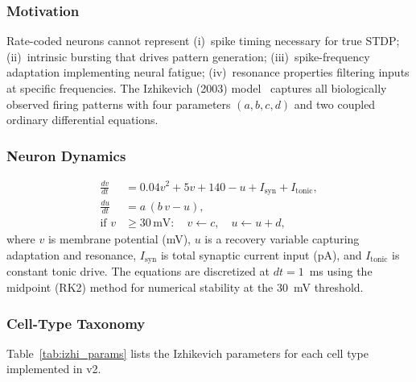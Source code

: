 \documentclass[11pt,a4paper]{article}
\begin{document}
\subsubsection{Motivation}

Rate-coded neurons cannot represent (i)~spike timing necessary for
true STDP; (ii)~intrinsic bursting that drives pattern generation;
(iii)~spike-frequency adaptation implementing neural fatigue;
(iv)~resonance properties filtering inputs at specific frequencies.
The Izhikevich (2003) model~\cite{izhikevich2003} captures all
biologically observed firing patterns with four parameters $(a, b, c, d)$
and two coupled ordinary differential equations.

\subsubsection{Neuron Dynamics}

\begin{equation}\label{eq:izhi}
\boxed{
\begin{aligned}
  \frac{dv}{dt} &= 0.04v^2 + 5v + 140 - u + I_\mathrm{syn} + I_\mathrm{tonic}, \\
  \frac{du}{dt} &= a\,(b\,v - u), \\
  \text{if } v &\geq 30\,\mathrm{mV}: \quad v \leftarrow c,\quad u \leftarrow u + d,
\end{aligned}
}
\end{equation}
where $v$ is membrane potential (mV), $u$ is a recovery variable
capturing adaptation and resonance, $I_\mathrm{syn}$ is total synaptic
current input (pA), and $I_\mathrm{tonic}$ is constant tonic drive.
The equations are discretized at $dt = 1$~ms using the midpoint (RK2)
method for numerical stability at the 30~mV threshold.

\subsubsection{Cell-Type Taxonomy}

Table~\ref{tab:izhi_params} lists the Izhikevich parameters for each
cell type implemented in v2.
\end{document}
